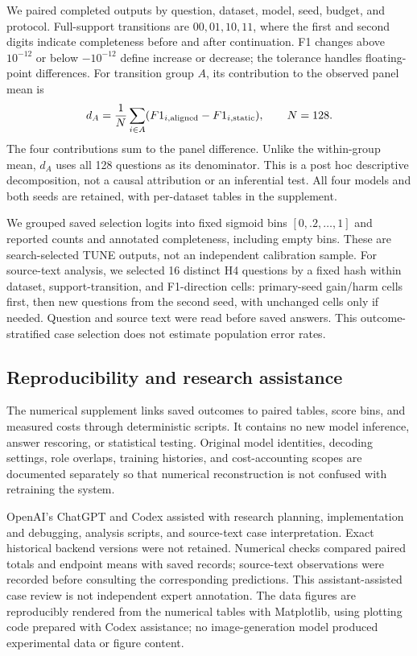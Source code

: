 \documentclass[preprint,12pt]{elsarticle}
\begin{document}
We paired completed outputs by question, dataset, model, seed, budget, and protocol. Full-support transitions are $00,01,10,11$, where the first and second digits indicate completeness before and after continuation. F1 changes above $10^{-12}$ or below $-10^{-12}$ define increase or decrease; the tolerance handles floating-point differences. For transition group $A$, its contribution to the observed panel mean is
\begin{equation}\label{eq:decomp}
d_A=\frac{1}{N}\sum_{i\in A}(F1_{i,\rm aligned}-F1_{i,\rm static}),\qquad N=128.
\end{equation}
The four contributions sum to the panel difference. Unlike the within-group mean, $d_A$ uses all 128 questions as its denominator. This is a post hoc descriptive decomposition, not a causal attribution or an inferential test. All four models and both seeds are retained, with per-dataset tables in the supplement.

We grouped saved selection logits into fixed sigmoid bins $[0,.2,\ldots,1]$ and reported counts and annotated completeness, including empty bins. These are search-selected TUNE outputs, not an independent calibration sample. For source-text analysis, we selected 16 distinct H4 questions by a fixed hash within dataset, support-transition, and F1-direction cells: primary-seed gain/harm cells first, then new questions from the second seed, with unchanged cells only if needed. Question and source text were read before saved answers. This outcome-stratified case selection does not estimate population error rates.

\subsection{Reproducibility and research assistance}
The numerical supplement links saved outcomes to paired tables, score bins, and measured costs through deterministic scripts. It contains no new model inference, answer rescoring, or statistical testing. Original model identities, decoding settings, role overlaps, training histories, and cost-accounting scopes are documented separately so that numerical reconstruction is not confused with retraining the system.

OpenAI's ChatGPT and Codex assisted with research planning, implementation and debugging, analysis scripts, and source-text case interpretation. Exact historical backend versions were not retained. Numerical checks compared paired totals and endpoint means with saved records; source-text observations were recorded before consulting the corresponding predictions. This assistant-assisted case review is not independent expert annotation. The data figures are reproducibly rendered from the numerical tables with Matplotlib, using plotting code prepared with Codex assistance; no image-generation model produced experimental data or figure content.
\end{document}
